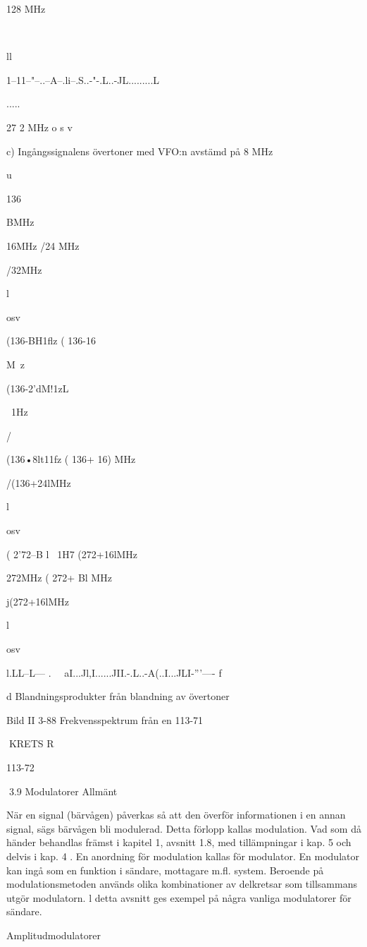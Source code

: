 \documentclass[a4paper,twoside,twocolumn,openright]{book}
\begin{document}
{{{{128 MHz

\

ll

1--11--"--..--A--.li--.S..-"-.L..-JL.........L

.....

27 2 MHz o s v

c) Ingångssignalens övertoner med VFO:n avstämd på 8 MHz

u

136

BMHz

16MHz
/24 MHz

/32MHz

l

osv

(136-BH1flz
( 136-16} M~z\

(136-2'dM!1zL

~1Hz

/

(136•8lt11fz
( 136+ 16) MHz

/(136+24lMHz

l

osv

( 2'72--B l ~1H7
(272+16lMHz\
\

272MHz
( 272+ Bl MHz

j(272+16lMHz

l

osv

l.LL--L---   .~~ aI...Jl,I......JII.-.L..-A(..I...JLI-'''---- f

d Blandningsprodukter från blandning av övertoner

Bild II 3-88 Frekvensspektrum från en
113-71

KRETS R

113-72

3.9 Modulatorer
Allmänt

När en signal (bärvågen) påverkas så att
den överför informationen i en annan signal,
sägs bärvågen bli modulerad. Detta förlopp
kallas modulation. Vad som då händer behandlas främst i kapitel 1, avsnitt 1.8, med
tillämpningar i kap. 5 och delvis i kap. 4 .
En anordning för modulation kallas för
modulator. En modulator kan ingå som en
funktion i sändare, mottagare m.fl. system.
Beroende på modulationsmetoden används
olika kombinationer av delkretsar som tillsammans utgör modulatorn.
l detta avsnitt ges exempel på några
vanliga modulatorer för sändare.

Amplitudmodulatorer

}}}
\end{document}
